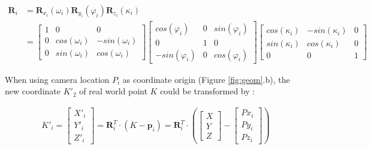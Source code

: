 \documentclass{configs/bmcart}
\begin{document}
\begin{align}
  \mathbf{R}_i & = \mathbf{R}_{x_i}(\omega_i) \mathbf{R}_{y_i}(\varphi_i) \mathbf{R}_{z_i}(\kappa_i) \nonumber\\
  & =
    \left[ 
      \begin{matrix} 
        1 & 0             & 0 \\
        0 & cos(\omega_i) & -sin(\omega_i) \\
        0 & sin(\omega_i) & cos(\omega_i)
      \end{matrix} 
    \right] 
    \left[ 
      \begin{matrix} 
        cos(\varphi_i)  & 0 & sin(\varphi_i) \\
        0               & 1 & 0 \\
        -sin(\varphi_i) & 0 & cos(\varphi_i)
      \end{matrix} 
    \right] 
    \left[ 
      \begin{matrix} 
        cos(\kappa_i) & -sin(\kappa_i) & 0 \\
        sin(\kappa_i) & cos(\kappa_i)  & 0 \\
        0             & 0              & 1
      \end{matrix} 
    \right] \nonumber %
\end{align}

When using camera location $P_i$ as coordinate origin (Figure \ref{fig:geom}.b), the new coordinate $K'_2$ of real world point $K$ could be transformed by \cite{pix4d_support_how_2020}:

\begin{align}
\label{eq:ki'}
K'_i = 
  \left[
    \begin{array}{c} X'_i \\ Y'_i \\ Z'_i \end{array} 
  \right]
  =
  \mathbf{R}_i^T \cdot (K - \mathbf{p}_i)
  =
  \mathbf{R}_i^T \cdot
  \left(
    \left[\begin{matrix} X \\ Y \\ Z \end{matrix}\right] - 
    \left[\begin{matrix} Px_i \\ Py_i \\ Pz_i \end{matrix}\right]
  \right)
\end{align}
\end{document}

